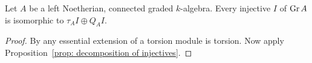 \begin{corollary} \label{cor: Gr injectives}
  Let \(A\) be a left Noetherian, connected graded \(k\)-algebra.
  Every injective \(I\) of \(\operatorname{Gr}A\) is isomorphic to \(\tau_A I \oplus Q_A I\).

\end{corollary}

\begin{proof}
  By \parencite[Prop 2.2]{AZ94} any essential extension of a torsion module is torsion.
  Now apply Proposition~\ref{prop: decomposition of injectives}.
\end{proof}
